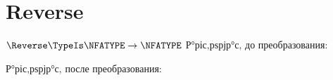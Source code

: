 \section{Reverse}
\begin{frame}{$\Reverse\TypeIs\NFATYPE\to\NFATYPE$}
	Р°ріс‚рѕрјр°с‚ до преобразования:

	Р°ріс‚рѕрјр°с‚ после преобразования:
\end{frame}